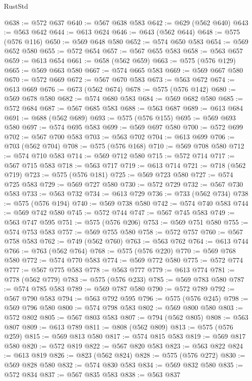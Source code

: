 \begin{lexlean}{RustStd}
\begin{coremodule}
@638 := @572 @637
@640 := @567 @638 @583
@642 := @629 (@562 @640)
@643 := @563 @642
@644 := @613 @624
@646 := @643 (@562 @644)
@648 := @575 (@576 @116)
@650 := @569 @648 @580
@652 := @574 @650 @583
@654 := @569 @652 @580
@655 := @572 @654
@657 := @567 @655 @583
@658 := @563 @657
@659 := @613 @654
@661 := @658 (@562 @659)
@663 := @575 (@576 @129)
@665 := @569 @663 @580
@667 := @574 @665 @583
@669 := @569 @667 @580
@670 := @572 @669
@672 := @567 @670 @583
@673 := @563 @672
@674 := @613 @669
@676 := @673 (@562 @674)
@678 := @575 (@576 @142)
@680 := @569 @678 @580
@682 := @574 @680 @583
@684 := @569 @682 @580
@685 := @572 @684
@687 := @567 @685 @583
@688 := @563 @687
@689 := @613 @684
@691 := @688 (@562 @689)
@693 := @575 (@576 @155)
@695 := @569 @693 @580
@697 := @574 @695 @583
@699 := @569 @697 @580
@700 := @572 @699
@702 := @567 @700 @583
@703 := @563 @702
@704 := @613 @699
@706 := @703 (@562 @704)
@708 := @575 (@576 @168)
@710 := @569 @708 @580
@712 := @574 @710 @583
@714 := @569 @712 @580
@715 := @572 @714
@717 := @567 @715 @583
@718 := @563 @717
@719 := @613 @714
@721 := @718 (@562 @719)
@723 := @575 (@576 @181)
@725 := @569 @723 @580
@727 := @574 @725 @583
@729 := @569 @727 @580
@730 := @572 @729
@732 := @567 @730 @583
@733 := @563 @732
@734 := @613 @729
@736 := @733 (@562 @734)
@738 := @575 (@576 @194)
@740 := @569 @738 @580
@742 := @574 @740 @583
@744 := @569 @742 @580
@745 := @572 @744
@747 := @567 @745 @583
@749 := @563 @747 @595
@751 := @575 (@576 @206)
@753 := @569 @751 @580
@755 := @574 @753 @583
@757 := @569 @755 @580
@758 := @572 @757
@760 := @567 @758 @583
@762 := @749 (@562 @760)
@763 := @563 @762
@764 := @613 @744
@766 := @763 (@562 @764)
@768 := @575 (@576 @220)
@770 := @569 @768 @580
@772 := @574 @770 @583
@774 := @569 @772 @580
@775 := @572 @774
@777 := @567 @775 @583
@778 := @563 @777
@779 := @613 @774
@781 := @778 (@562 @779)
@783 := @575 (@576 @233)
@785 := @569 @783 @580
@787 := @574 @785 @583
@789 := @569 @787 @580
@790 := @572 @789
@792 := @567 @790 @583
@794 := @563 @792 @595
@796 := @575 (@576 @245)
@798 := @569 @796 @580
@800 := @574 @798 @583
@802 := @569 @800 @580
@803 := @572 @802
@805 := @567 @803 @583
@807 := @794 (@562 @805)
@808 := @563 @807
@809 := @613 @789
@811 := @808 (@562 @809)
@813 := @575 (@576 @259)
@815 := @569 @813 @580
@817 := @574 @815 @583
@819 := @569 @817 @580
@820 := @572 @819
@822 := @567 @820 @583
@823 := @563 @822
@824 := @613 @819
@826 := @823 (@562 @824)
@828 := @575 (@576 @272)
@830 := @569 @828 @580
@832 := @574 @830 @583
@834 := @569 @832 @580
@835 := @572 @834
@837 := @567 @835 @583
@838 := @563 @837

\end{coremodule}
\end{lexlean}
